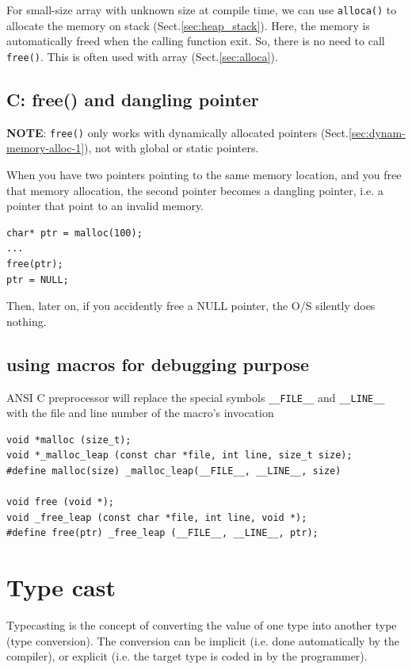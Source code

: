 For small-size array with unknown size at compile time, we can use
\verb!alloca()! to allocate the memory on stack (Sect.\ref{sec:heap_stack}).
Here, the memory is automatically freed when the calling function exit. So,
there is no need to call \verb!free()!.  This is often used with array
(Sect.\ref{sec:alloca}).


\subsection{C: free() and dangling pointer}
\label{sec:free()}

{\bf NOTE}: \verb!free()! only works with dynamically allocated pointers
(Sect.\ref{sec:dynam-memory-alloc-1}), not with global or static pointers.

When you have two pointers pointing to the same memory location, and you free
that memory allocation, the second pointer becomes a dangling pointer, i.e. a
pointer that point to an invalid memory.

\begin{verbatim}
char* ptr = malloc(100);
...
free(ptr);
ptr = NULL;
\end{verbatim}
Then, later on, if you accidently free a NULL pointer, the O/S silently does
nothing.

\subsection{using macros for debugging purpose}

ANSI C preprocessor will replace the special symbols \verb!__FILE__! and
\verb!__LINE__! with the file and line number of the macro's invocation

\begin{verbatim}
void *malloc (size_t);
void *_malloc_leap (const char *file, int line, size_t size);
#define malloc(size) _malloc_leap(__FILE__, __LINE__, size)

void free (void *);
void _free_leap (const char *file, int line, void *);
#define free(ptr) _free_leap (__FILE__, __LINE__, ptr);

\end{verbatim}



\section{Type cast}
\label{sec:type-cast}

Typecasting is the concept of converting the value of one type into another type
(type conversion). The conversion can be implicit (i.e. done automatically by
the compiler), or explicit (i.e. the target type is coded in by the programmer).

